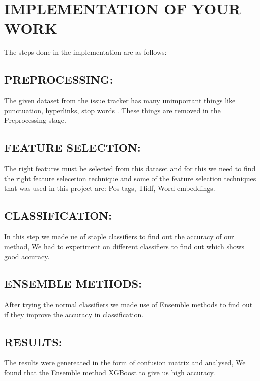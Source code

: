 
\chapter{\uppercase{Implementation of your work}} %
\label{chap4} %
The steps done in the implementation are as follows:
\section{\uppercase{Preprocessing:}}
The given dataset from the issue tracker has many unimportant things like punctuation, hyperlinks, stop words . These things are removed in the Preprocessing stage.
\section{\uppercase{Feature Selection:}}
The right features must be selected from this dataset and for this we need to find the right feature selecetion technique and some of the feature selection techniques that was used in this project are: Pos-tags, Tfidf, Word embeddings.
\section{\uppercase{Classification:}}
In this step we made  ue of staple classifiers to find out the accuracy of our method, We had to experiment on different classifiers to find out which shows good accuracy.
\section{\uppercase{Ensemble Methods:}}
After trying the normal classifiers we made use of Ensemble methods to find out if they improve the accuracy in classification.
\section{\uppercase{Results:}}
The results were genereated in the form of confusion matrix and analysed, We found that the Ensemble method XGBoost to give us high accuracy.




